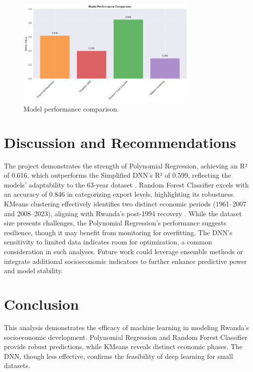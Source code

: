 \documentclass[12pt]{article}
\begin{document}
	\begin{figure}[H]
		\centering
		\includegraphics[width=0.8\textwidth]{../figures/performance_comparison.png}
		\caption{Model performance comparison.}
		\label{fig:performance_comparison}
	\end{figure}
	
	\section{Discussion and Recommendations}
	The project demonstrates the strength of Polynomial Regression, achieving an R² of 0.616, which outperforms the Simplified DNN’s R² of 0.599, reflecting the models’ adaptability to the 63-year dataset \citep{worldbank2023, hastie2009}. Random Forest Classifier excels with an accuracy of 0.846 in categorizing export levels, highlighting its robustness. KMeans clustering effectively identifies two distinct economic periods (1961–2007 and 2008–2023), aligning with Rwanda’s post-1994 recovery \citep{un2020}. While the dataset size presents challenges, the Polynomial Regression’s performance suggests resilience, though it may benefit from monitoring for overfitting. The DNN’s sensitivity to limited data indicates room for optimization, a common consideration in such analyses. Future work could leverage ensemble methods or integrate additional socioeconomic indicators to further enhance predictive power and model stability.
	
	\section{Conclusion}
	This analysis demonstrates the efficacy of machine learning in modeling Rwanda's socioeconomic development. Polynomial Regression and Random Forest Classifier provide robust predictions, while KMeans reveals distinct economic phases. The DNN, though less effective, confirms the feasibility of deep learning for small datasets.
	
\end{document}
